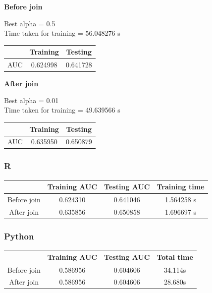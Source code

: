 \documentclass[10pt]{article}
\begin{document}
\textbf{Before join}

	Best alpha = 0.5 
\\

	Time taken for training = 56.048276 s

\begin{center}
 \begin{tabular}{|c | c | c ||} 
 \hline
 & Training & Testing\\ [0.5ex] 
 \hline\hline
AUC & 0.624998 & 0.641728\\
 \hline
\end{tabular}
\end{center}

\textbf{After join}

	Best alpha = 0.01 
\\

	Time taken for training = 49.639566 s

\begin{center}
 \begin{tabular}{|c | c | c ||} 
 \hline
 & Training & Testing\\ [0.5ex] 
 \hline\hline
AUC & 0.635950 & 0.650879\\
 \hline
\end{tabular}
\end{center}

\subsubsection{R}
\begin{center}
 \begin{tabular}{|c | c | c | c||} 
 \hline
 & Training AUC & Testing AUC & Training time\\ [0.5ex] 
 \hline\hline
Before join & 0.624310 & 0.641046 & 1.564258 s\\
 \hline
After join & 0.635856 & 0.650858 & 1.696697 s\\ 
 \hline
\end{tabular}
\end{center}

\subsubsection{Python}
\begin{center}
 \begin{tabular}{|c | c | c | c||} 
 \hline
 & Training AUC & Testing AUC & Total time\\ [0.5ex] 
 \hline\hline
Before join & 0.586956 & 0.604606 & 34.114s\\
 \hline
After join & 0.586956 & 0.604606 & 28.680s\\ 
 \hline
\end{tabular}
\end{center}
\end{document}
